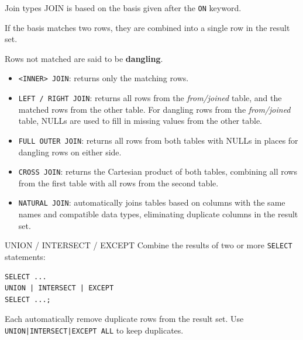 \begin{theorem}
    {Join types}
    JOIN is based on the basis given after the \texttt{ON} keyword.

    If the basis matches two rows, they are combined into a single row in the result set.

    Rows not matched are said to be \textbf{dangling}.
    \begin{itemize}
        \item \texttt{<INNER> JOIN}: returns only the matching rows.
        \item \texttt{LEFT / RIGHT JOIN}: returns all rows from the \textit{from/joined} table, and the matched rows from the other table. For dangling rows from the \textit{from/joined} table, NULLs are used to fill in missing values from the other table.
        \item \texttt{FULL OUTER JOIN}: returns all rows from both tables with NULLs in places for dangling rows on either side.
        \item \texttt{CROSS JOIN}: returns the Cartesian product of both tables, combining all rows from the first table with all rows from the second table.
        \item \texttt{NATURAL JOIN}: automatically joins tables based on columns with the same names and compatible data types, eliminating duplicate columns in the result set.
    \end{itemize}
\end{theorem}

\begin{definition}
    {UNION / INTERSECT / EXCEPT}
    Combine the results of two or more \texttt{SELECT} statements:
    \begin{verbatim}
SELECT ...
UNION | INTERSECT | EXCEPT
SELECT ...;
    \end{verbatim}
    Each automatically remove duplicate rows from the result set. Use \texttt{UNION|INTERSECT|EXCEPT ALL} to keep duplicates.
\end{definition}

